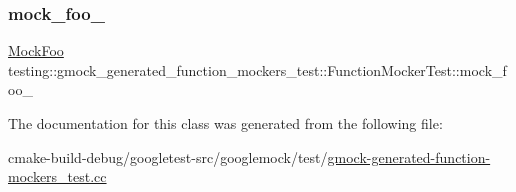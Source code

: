 \mbox{\label{classtesting_1_1gmock__generated__function__mockers__test_1_1FunctionMockerTest_a265659f07a0e75152ab295add4769585}} 
\subsubsection{\texorpdfstring{mock\_foo\_}{mock\_foo\_}}
{\footnotesize\ttfamily \mbox{\hyperlink{classtesting_1_1gmock__generated__function__mockers__test_1_1MockFoo}{Mock\+Foo}} testing\+::gmock\+\_\+generated\+\_\+function\+\_\+mockers\+\_\+test\+::\+Function\+Mocker\+Test\+::mock\+\_\+foo\+\_\+\hspace{0.3cm}{\ttfamily [protected]}}



The documentation for this class was generated from the following file\+:\begin{DoxyCompactItemize}
\item 
cmake-\/build-\/debug/googletest-\/src/googlemock/test/\mbox{\hyperlink{gmock-generated-function-mockers__test_8cc}{gmock-\/generated-\/function-\/mockers\+\_\+test.\+cc}}\end{DoxyCompactItemize}
